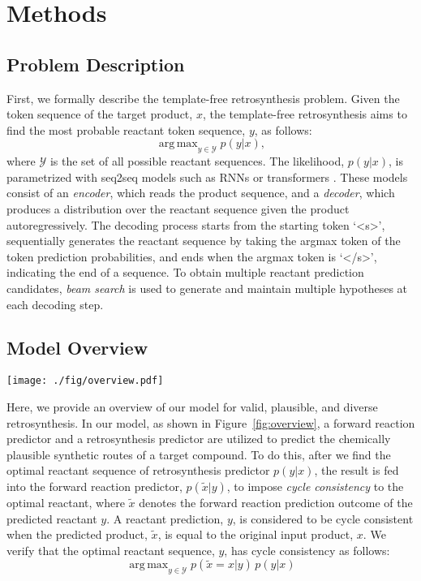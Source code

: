 \documentclass[journal=jacsat,manuscript=article]{achemso}
\DeclareMathOperator*{\argmax}{arg\,max}
\begin{document}
	\section{Methods}

	
	\subsection{Problem Description}
	
	
	First, we formally describe the template-free retrosynthesis problem. Given the token sequence of the target product, $x$, the template-free retrosynthesis aims to find the most probable reactant token sequence, $y$, as follows:
	\begin{equation}
	\argmax_{y\in\mathcal{Y}} p(y|x),
	\end{equation}
	where $\mathcal{Y}$ is the set of all possible reactant sequences. The likelihood, $p(y|x)$, is parametrized with seq2seq models such as RNNs \cite{nam2016linking, liu2017retrosynthetic} or transformers \cite{schwaller2019molecular, zheng2019predicting, chen2019learning, karpov2019transformer}. These models consist of an \textit{encoder}, which reads the product sequence, and a \textit{decoder}, which produces a distribution over the reactant sequence given the product autoregressively. The decoding process starts from the starting token `<s>', sequentially generates the reactant sequence by taking the argmax token of the token prediction probabilities, and ends when the argmax token is `</s>', indicating the end of a sequence. To obtain multiple reactant prediction candidates, \textit{beam search} is used to generate and maintain multiple hypotheses at each decoding step.
	
	
	\subsection{Model Overview}
	

	\begin{figure*}
		\centering
		\texttt{[image: ./fig/overview.pdf]}
		\caption{Overview of the proposed model.}
		\label{fig:overview}
	\end{figure*}

	
	Here, we provide an overview of our model for valid, plausible, and diverse retrosynthesis. In our model, as shown in Figure~\ref{fig:overview}, a forward reaction predictor and a retrosynthesis predictor are utilized to predict the chemically plausible synthetic routes of a target compound. To do this, after we find the optimal reactant sequence of retrosynthesis predictor $p(y|x)$, the result is fed into the forward reaction predictor, $p(\tilde{x}|y)$, to impose \textit{cycle consistency} to the optimal reactant, where $\tilde{x}$ denotes the forward reaction prediction outcome of the predicted reactant $y$. A reactant prediction, $y$, is considered to be cycle consistent when the predicted product, $\tilde{x}$, is equal to the original input product, $x$. We verify that the optimal reactant sequence, $y$, has cycle consistency as follows:
	\begin{equation}
	\argmax_{y\in\mathcal{Y}} p(\tilde{x}=x|y) \, p(y|x)
	\end{equation}
	
\end{document}

